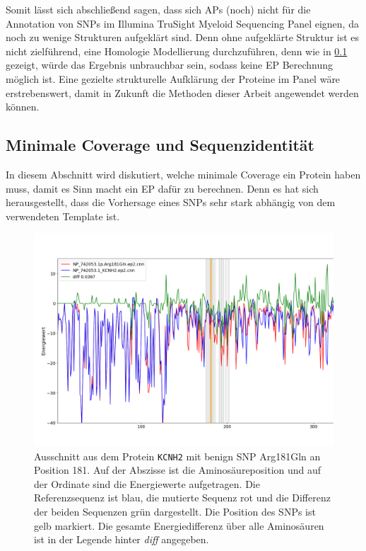 Somit lässt sich abschließend sagen, dass sich \ac{APs} (noch) nicht für die Annotation von \ac{SNP}s im Illumina TruSight Myeloid Sequencing Panel eignen, da noch zu wenige Strukturen aufgeklärt sind. Denn ohne aufgeklärte Struktur ist es nicht zielführend, eine Homologie Modellierung durchzuführen, denn wie in \ref{sec:min_coverage} gezeigt, würde das Ergebnis unbrauchbar sein, sodass keine \ac{EP} Berechnung möglich ist. Eine gezielte strukturelle Aufklärung der Proteine im Panel wäre erstrebenswert, damit in Zukunft die Methoden dieser Arbeit angewendet werden können.


\subsection{Minimale Coverage und Sequenzidentität}
\label{sec:min_coverage}

In diesem Abschnitt wird diskutiert, welche minimale Coverage ein Protein haben muss, damit es Sinn macht ein \ac{EP} dafür zu berechnen. Denn es hat sich herausgestellt, dass die Vorhersage eines \ac{SNP}s sehr stark abhängig von dem verwendeten Template ist.

\begin{figure}[H]
    \centering
    \includegraphics[width=.99\textwidth]{images/comp_plot_KCNH2_Arg181Gln.png}
    \caption{Ausschnitt aus dem Protein \texttt{KCNH2} mit benign \ac{SNP} Arg181Gln an Position 181. Auf der Abszisse ist die Aminosäureposition und auf der Ordinate sind die Energiewerte aufgetragen. Die Referenzsequenz ist blau, die mutierte Sequenz rot und die Differenz der beiden Sequenzen grün dargestellt. Die Position des \ac{SNP}s ist gelb markiert. Die gesamte Energiedifferenz über alle Aminosäuren ist in der Legende hinter \emph{diff} angegeben.}
    \label{fig:fail_ep}
\end{figure}


